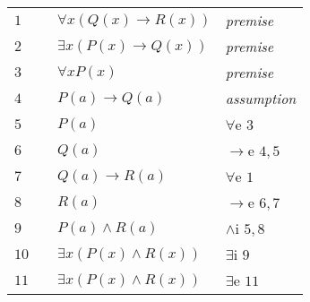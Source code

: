 \documentclass[12pt]{article}
\begin{document}
\begin{table}[H]
	\centering
	\begin{tabular}{*4{l}}
		$1$ & & $\forall x (Q(x) \rightarrow R(x))$ & \textit{premise} \\ 
		
		$2$ & & $\exists x (P(x) \rightarrow Q(x))$ & \textit{premise} \\ 
		
		$3$ & & $\forall xP(x)$ & \textit{premise} \\  \hline
		
		$4$ & & $P(a) \rightarrow Q(a)$ &\textit{assumption}\\ 
		
		$5$ & & $P(a)$ &$\forall$e $3$\\
		
		$6$ & & $Q(a)$ &$\rightarrow$e $4,5$\\ 
		
		$7$ & & $Q(a) \rightarrow R(a)$ &$\forall$e $1$\\ 
		
		$8$ & & $R(a)$ &$\rightarrow$e $6,7$\\
		
		$9$ & & $P(a) \wedge R(a)$ &$\wedge$i $5,8$\\
		
		$10$ & & $\exists x (P(x) \wedge R(x))$ &$\exists$i $9$\\ \hline
		
		$11$ & & $\exists x (P(x) \wedge R(x))$ &$\exists$e $11$\\
		
	\end{tabular}
\end{table}
\end{document}
